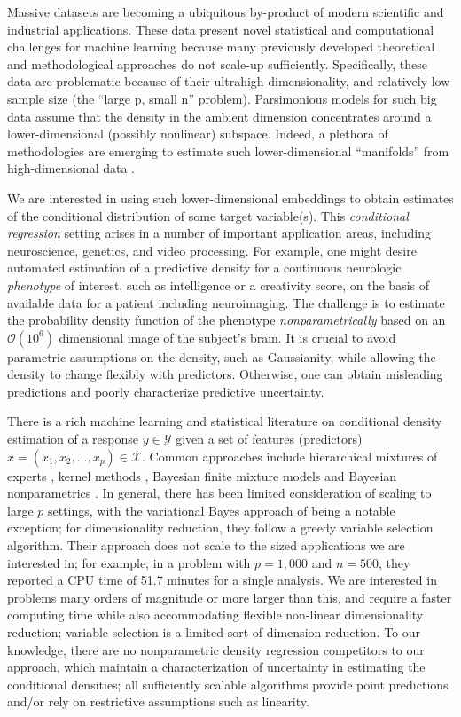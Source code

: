 \documentclass{article}
\begin{document}
Massive datasets are becoming a ubiquitous by-product of modern scientific and industrial applications. These data present novel statistical and computational challenges for machine learning because many previously developed theoretical and methodological approaches do not scale-up sufficiently.  Specifically, these data are problematic because of their ultrahigh-dimensionality, and relatively low sample size (the ``large p, small n'' problem).  Parsimonious models for such big data assume that the density in the ambient dimension concentrates around a lower-dimensional (possibly nonlinear) subspace.  Indeed, a plethora of methodologies are emerging to estimate such lower-dimensional ``manifolds'' from high-dimensional data \cite{Manifold, Maggioni}.  

We are interested in using such lower-dimensional embeddings to obtain estimates of the conditional distribution of some target variable(s).  This \emph{conditional regression} setting arises in a number of important application areas, including neuroscience, genetics, and video processing.  For example, one might desire automated estimation of a predictive density for a continuous neurologic {\em phenotype} of interest, such as intelligence or a creativity score, on the basis of available data for a patient including neuroimaging.  The challenge is to estimate the probability density function of the phenotype {\em nonparametrically} based on an $\mathcal{O}(10^6)$ dimensional image of the subject's brain.  It is crucial to avoid parametric assumptions on the density, such as Gaussianity, while allowing the density to change flexibly with predictors.  Otherwise, one can obtain misleading predictions and poorly characterize predictive uncertainty.

There is a rich machine learning and statistical literature on conditional density estimation of a response $y \in \mathcal{Y}$ given a set of features (predictors) $x=(x_1, x_2, \ldots, x_p)\in \mathcal{X}$. Common approaches include hierarchical mixtures of experts \cite{mixtureexperts,jiang1999}, kernel methods \cite{fan1996,fanyim2004,holmes2010,fu2011}, Bayesian finite mixture models \cite{nott2012,tran2012,norets2012} and Bayesian nonparametrics 
\cite{griffin06, dunson2007, DunsonPark, chung2009, tokdar2010}.  In general, there has been limited consideration of scaling to large $p$ settings, with the variational Bayes approach of \cite{tran2012} being a notable exception; for dimensionality reduction, they follow a greedy variable selection algorithm.  Their approach does not scale to the sized applications we are interested in; for example, in a problem with $p=1,000$ and $n=500$, they reported a CPU time of 51.7 minutes for a single analysis.  We are interested in problems many orders of magnitude or more larger than this, and require a faster computing time while also accommodating flexible non-linear dimensionality reduction; variable selection is a limited sort of dimension reduction.  To our knowledge, there are no nonparametric density regression competitors to our approach, which maintain a characterization of uncertainty in estimating the conditional densities; all sufficiently scalable algorithms provide point predictions and/or rely on restrictive assumptions such as linearity.  
\end{document}
